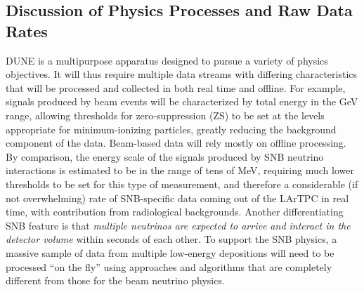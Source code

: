 \subsection{Discussion of Physics Processes and Raw Data Rates} 

\label{sec:detectors-sc-infrastructure-data-rates}



DUNE is a multipurpose apparatus designed to pursue a variety of physics objectives. It will thus
require multiple data streams with differing characteristics that will be processed and collected in both real time and offline. 
%
For example, signals produced by beam events will be characterized by total energy in the GeV range, allowing
 thresholds for zero-suppression (ZS) to be set at the levels appropriate for
minimum-ionizing particles, %
greatly reducing the
background component of the data. Beam-based data will rely mostly on offline processing. By comparison, the energy scale of the signals produced by
SNB neutrino interactions %
is estimated to be in the range of tens
of MeV, %
requiring much lower thresholds to be set for this type of measurement, and therefore
a considerable (if not overwhelming) rate of SNB-specific data coming
out of the LArTPC in real time, with contribution from radiological backgrounds.
Another differentiating SNB feature is that \textit{multiple neutrinos are expected
to arrive and interact in the detector volume} %
within seconds
of each other. %
To support the SNB physics, a massive sample of data from multiple low-energy
depositions will need to be processed ``on the fly''
using approaches and algorithms that are completely  different from those for the
beam neutrino physics. %

